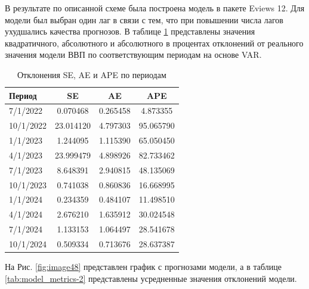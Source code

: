 \documentclass[a4paper, 14pt]{extreport}
\numberwithin{equation}{section}
\numberwithin{equation}{section}
\begin{document}
	В результате по описанной схеме была построена модель в пакете Eviews 12. Для модели был выбран один лаг в связи с тем, что при повышении числа лагов ухудшались качества прогнозов. В таблице \ref{tab:metrics-4} представлены значения квадратичного, абсолютного и абсолютного в процентах отклонений от реального значения модели ВВП по соответствующим периодам на основе VAR.
	
	\begin{table}[h!]
		\centering
		\caption{Отклонения SE, AE и APE по периодам}
		\begin{tabular}{lccc}
			\toprule
			\textbf{Период} & \textbf{SE} & \textbf{AE} & \textbf{APE} \\ 
			\midrule
			7/1/2022  & 0.070468      & 0.265458     & 4.873355      \\ 
			10/1/2022 & 23.014120     & 4.797303     & 95.065790     \\ 
			1/1/2023  & 1.244095      & 1.115390     & 65.050450     \\ 
			4/1/2023  & 23.999479     & 4.898926     & 82.733462     \\ 
			7/1/2023  & 8.648391      & 2.940815     & 48.135069     \\ 
			10/1/2023 & 0.741038      & 0.860836     & 16.668995     \\ 
			1/1/2024  & 0.234359      & 0.484107     & 11.498510     \\ 
			4/1/2024  & 2.676210      & 1.635912     & 30.024548     \\ 
			7/1/2024  & 1.133153      & 1.064497     & 28.541678     \\ 
			10/1/2024 & 0.509334      & 0.713676     & 28.637387     \\ 
			\bottomrule
		\end{tabular}
		\label{tab:metrics-4}
	\end{table}
	
	На Рис. \ref{fig:image48} представлен график с прогнозами модели, а в таблице \ref{tab:model_metrics-2} представлены усредненные значения отклонений модели.
	
\end{document}
